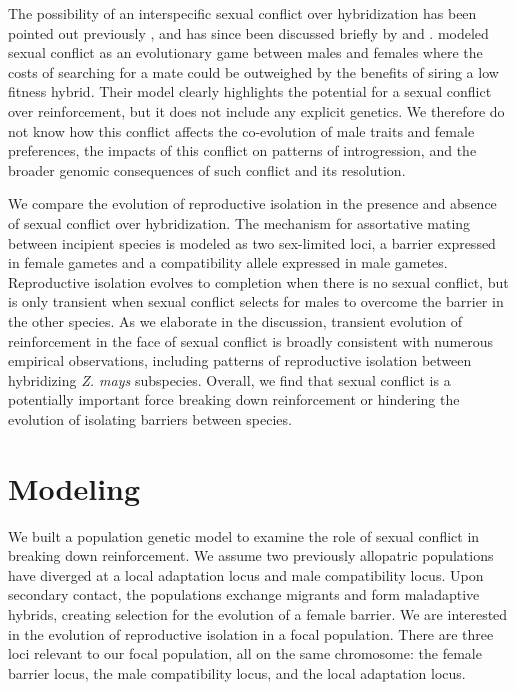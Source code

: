 \documentclass[11pt]{article}
\begin{document}
The possibility of an interspecific sexual conflict over hybridization has been pointed out previously \citet{parker1998}, and has since been discussed briefly by \citet{gavrilets2005} and \citet{coyneandorrbook}.  
\citep{parker1998} modeled sexual conflict as an evolutionary game between males and females where the costs of searching for a mate could be outweighed by the benefits of siring a low fitness hybrid. 
Their model clearly highlights the potential for a sexual conflict over reinforcement, but it does not include any explicit genetics.  We therefore do not know how this conflict affects the co-evolution of male traits and female preferences, the impacts of this conflict on patterns of introgression, and the broader genomic consequences of such conflict and its resolution. 

We compare the evolution of reproductive isolation in the presence and absence of sexual conflict over hybridization. 
The mechanism for assortative mating between incipient species is modeled as two sex-limited loci, a barrier expressed in female gametes and a compatibility allele expressed in male gametes.  
Reproductive isolation evolves to completion when there is no sexual conflict, but is only transient  when sexual conflict selects for males to overcome the barrier in the other species.  
As we elaborate in the discussion, transient evolution of reinforcement in the face of sexual conflict is broadly consistent with numerous empirical observations, including patterns of reproductive isolation between hybridizing \textit{Z. mays} subspecies.  
Overall, we find that sexual conflict is a potentially important force breaking down reinforcement or hindering the evolution of isolating barriers between species. 






\section*{Modeling}

We built a population genetic model to examine the role of sexual conflict in breaking down reinforcement. We assume two previously allopatric populations have diverged at a local adaptation locus and male compatibility locus. Upon secondary contact, the populations exchange migrants and form maladaptive hybrids, creating selection for the evolution of a female barrier. We are interested in the evolution of reproductive isolation in a focal population. There are three loci relevant to our focal population, all on the same chromosome: the female barrier locus, the male compatibility locus, and the local adaptation locus. 
\end{document}
